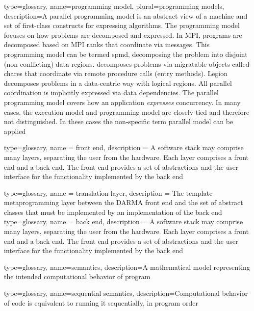 {
  type=glossary,
  name={programming model},
  plural={programming models},
  description={A parallel programming model is an abstract view of a machine
    and set of first-class constructs for expressing algorithms. The programming
      model focuses on how problems are decomposed and expressed.  In
      \gls{MPI}, programs are decomposed based on \gls{MPI} ranks that coordinate via
      messages. This programming model can be termed \gls{spmd}, decomposing
      the problem into disjoint (non-conflicting) data regions.  \Charm{}
    decomposes problems via migratable objects called \glspl{chare} that coordinate via remote procedure calls (entry methods). Legion decomposes problems in a data-centric way with logical regions.  All parallel coordination is implicitly expressed via data dependencies.  The parallel programming model covers how an application \emph{expresses} concurrency.
In many cases, the \gls{execution model} and programming model are closely tied
and therefore not distinguished. In these cases the non-specific term parallel
model can be applied}
}

{
  type=glossary,
  name = {front end},
  description = {A software stack may comprise many layers, separating the 
    user from the hardware.  Each layer comprises a front end
      and a \gls{back end}.  The front end provides a set of abstractions and the
      user interface for the functionality implemented by the back end}
}

{
  type=glossary,
  name = {translation layer},
  description = {The \CC \gls{template metaprogramming} layer between the
    DARMA \gls{front end} and the set of abstract classes that must be implemented
    by an implementation of the \gls{back end}}
}
{
  type=glossary,
  name = {back end},
  description = {A software stack may comprise many layers, separating the 
    user from the hardware.  Each layer comprises a \gls{front end}
      and a back end.  The front end provides a set of abstractions and the
      user interface for the functionality implemented by the back end}
}

{
  type=glossary,
    name={semantics},
    description={A mathematical model representing the intended computational behavior of program}
}

{
  type=glossary,
  name={sequential semantics},
  description={Computational behavior of code is equivalent to running it
    sequentially, in program order}
}

